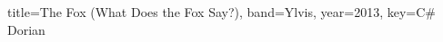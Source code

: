 \documentclass{../../tex/bekki-leadsheet}
\begin{document}
\begin{song}{title={The Fox (What Does the Fox Say?)}, band={Ylvis}, year={2013}, key={C# Dorian}}

  

\end{song}
\end{document}
